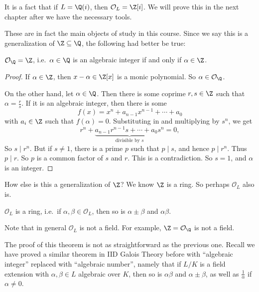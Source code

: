 \documentclass[a4paper]{article}
\begin{document}
\begin{eg}
  It is a fact that if $L = \Q(i)$, then $\mathcal{O}_L = \Z[i]$. We will prove this in the next chapter after we have the necessary tools.
\end{eg}

These are in fact the main objects of study in this course. Since we say this is a generalization of $\Z \subseteq \Q$, the following had better be true:

\begin{lemma}
  $\mathcal{O}_\Q = \Z$, i.e.\ $\alpha \in \Q$ is an algebraic integer if and only if $\alpha \in \Z$.
\end{lemma}

\begin{proof}
  If $\alpha \in \Z$, then $x - \alpha \in \Z[x]$ is a monic polynomial. So $\alpha \in \mathcal{O}_\Q$.

  On the other hand, let $\alpha \in \Q$. Then there is some coprime $r, s \in \Z$ such that $\alpha = \frac{r}{s}$. If it is an algebraic integer, then there is some
  \[
    f(x) = x^n + a_{n - 1} x^{n - 1} + \cdots + a_0
  \]
  with $a_i \in \Z$ such that $f(\alpha) = 0$. Substituting in and multiplying by $s^n$, we get
  \[
    r^n + \underbrace{a_{n - 1} r^{n - 1}s + \cdots + a_0 s^n}_{\text{divisible by }s} = 0,
  \]
  So $s\mid r^n$. But if $s\not= 1$, there is a prime $p$ such that $p \mid s$, and hence $p \mid r^n$. Thus $p \mid r$. So $p$ is a common factor of $s$ and $r$. This is a contradiction. So $s = 1$, and $\alpha$ is an integer.
\end{proof}

How else is this a generalization of $\Z$? We know $\Z$ is a ring. So perhaps $\mathcal{O}_L$ also is.

\begin{thm}
  $\mathcal{O}_L$ is a ring, i.e.\ if $\alpha, \beta \in \mathcal{O}_L$, then so is $\alpha \pm \beta$ and $\alpha\beta$.
\end{thm}
Note that in general $\mathcal{O}_L$ is not a field. For example, $\Z = \mathcal{O}_\Q$ is not a field.

The proof of this theorem is not as straightforward as the previous one. Recall we have proved a similar theorem in IID Galois Theory before with ``algebraic integer'' replaced with ``algebraic number'', namely that if $L/K$ is a field extension with $\alpha, \beta \in L$ algebraic over $K$, then so is $\alpha\beta$ and $\alpha \pm \beta$, as well as $\frac{1}{\alpha}$ if $\alpha \not= 0$.
\end{document}
